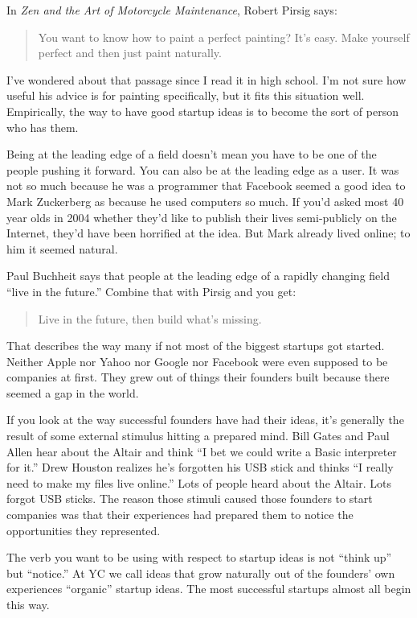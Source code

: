 \documentclass[12pt]{book}
\begin{document}
In \emph{Zen and the Art of Motorcycle Maintenance}, Robert Pirsig says:

\begin{quote}
You want to know how to paint a perfect painting? It's easy. Make
yourself perfect and then just paint naturally.
\end{quote}

I've wondered about that passage since I read it in high school. I'm not
sure how useful his advice is for painting specifically, but it fits
this situation well. Empirically, the way to have good startup ideas is
to become the sort of person who has them.

Being at the leading edge of a field doesn't mean you have to be one of
the people pushing it forward. You can also be at the leading edge as a
user. It was not so much because he was a programmer that Facebook
seemed a good idea to Mark Zuckerberg as because he used computers so
much. If you'd asked most 40 year olds in 2004 whether they'd like to
publish their lives semi-publicly on the Internet, they'd have been
horrified at the idea. But Mark already lived online; to him it seemed
natural.

Paul Buchheit says that people at the leading edge of a rapidly changing
field ``live in the future.'' Combine that with Pirsig and you get:

\begin{quote}
Live in the future, then build what's missing.
\end{quote}

That describes the way many if not most of the biggest startups got
started. Neither Apple nor Yahoo nor Google nor Facebook were even
supposed to be companies at first. They grew out of things their
founders built because there seemed a gap in the world.

If you look at the way successful founders have had their ideas, it's
generally the result of some external stimulus hitting a prepared mind.
Bill Gates and Paul Allen hear about the Altair and think ``I bet we
could write a Basic interpreter for it.'' Drew Houston realizes he's
forgotten his USB stick and thinks ``I really need to make my files live
online.'' Lots of people heard about the Altair. Lots forgot USB sticks.
The reason those stimuli caused those founders to start companies was
that their experiences had prepared them to notice the opportunities
they represented.

The verb you want to be using with respect to startup ideas is not
``think up'' but ``notice.'' At YC we call ideas that grow naturally out
of the founders' own experiences ``organic'' startup ideas. The most
successful startups almost all begin this way.
\end{document}
